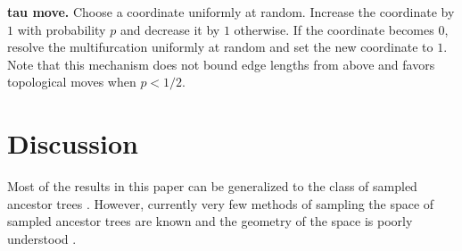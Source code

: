 \documentclass{amsart}
\theoremstyle{definition}
\begin{document}
{\bf tau move.}
Choose a coordinate uniformly at random.
Increase the coordinate by $1$ with probability $p$ and decrease it by $1$ otherwise.
If the coordinate becomes $0$, resolve the multifurcation uniformly at random and set the new coordinate to $1$.
Note that this mechanism does not bound edge lengths from above and favors topological moves when $p<1/2$.


\section{Discussion}
Most of the results in this paper can be generalized to the class of sampled ancestor trees \autocite{Gavryushkina2014-xd}.
However, currently very few methods of sampling the space of sampled ancestor trees are known \autocite{Gavryushkina2015-vq} and the geometry of the space is poorly understood \autocite{Gavryushkin2014-bw}.

%
%

\printbibliography
\end{document}
